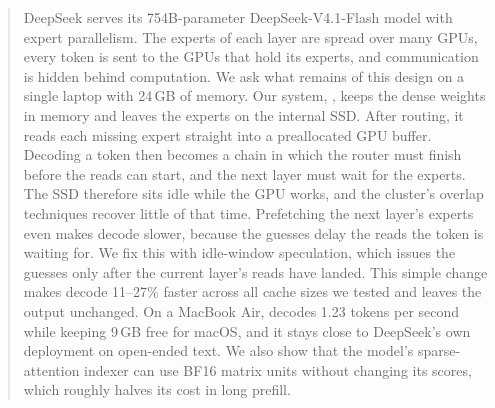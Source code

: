 \begin{abstract}
DeepSeek serves its 754B-parameter DeepSeek-V4.1-Flash model with expert parallelism. The experts of each layer are spread over many GPUs, every token is sent to the GPUs that hold its experts, and communication is hidden behind computation. We ask what remains of this design on a single laptop with 24\,GB of memory. Our system, \method{}, keeps the dense weights in memory and leaves the experts on the internal SSD. After routing, it reads each missing expert straight into a preallocated GPU buffer. Decoding a token then becomes a chain in which the router must finish before the reads can start, and the next layer must wait for the experts. The SSD therefore sits idle while the GPU works, and the cluster's overlap techniques recover little of that time. Prefetching the next layer's experts even makes decode slower, because the guesses delay the reads the token is waiting for. We fix this with idle-window speculation, which issues the guesses only after the current layer's reads have landed. This simple change makes decode 11--27\% faster across all cache sizes we tested and leaves the output unchanged. On a MacBook Air, \method{} decodes 1.23 tokens per second while keeping 9\,GB free for macOS, and it stays close to DeepSeek's own deployment on open-ended text. We also show that the model's sparse-attention indexer can use BF16 matrix units without changing its scores, which roughly halves its cost in long prefill.
\end{abstract}
